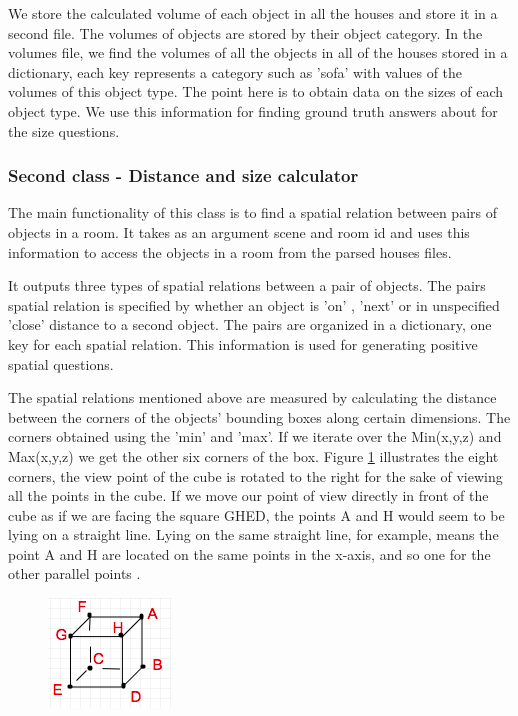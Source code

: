  We store the calculated volume of each object in all the houses and store it in a second file. The volumes of objects are stored by their object category. In the volumes file, we find the volumes of all the objects in all of the houses stored in a dictionary, each key represents a category such as 'sofa' with values of the volumes of this object type. The point here is to obtain data on the sizes of each object type. We use this information for finding ground truth answers about for the size questions.  
 

\subsubsection{Second class - Distance and size calculator}

The main functionality of this class is to find a spatial relation between pairs of objects in a room. It takes as an argument scene and room id and uses this information to access the objects in a room from the parsed houses files. 

It outputs three types of spatial relations between a pair of objects. The pairs spatial relation is specified by whether an object is 'on' , 'next' or in unspecified 'close' distance to a second object. The pairs are organized in a dictionary, one key for each spatial relation. This information is used for generating positive spatial questions. 

The spatial relations mentioned above are measured by calculating the distance between the corners of the objects' bounding boxes along certain dimensions. The corners obtained using the 'min' and 'max'. If we iterate over the Min(x,y,z) and Max(x,y,z) we get the other six corners of the box. Figure \ref{fig:box_points} illustrates the eight corners, the view point of the cube is rotated to the right for the sake of viewing all the points in the cube. If we move our point of view directly in front of the cube as if  we are facing the square GHED,  the points A and H would seem to be lying on a straight line. Lying on the same straight line, for example, means the point A and H are located on the same points in the x-axis, and so one for the other parallel points .\begin{figure}[H]
\includegraphics{images/cornerPoints.png} %
\caption{}
\label{fig:box_points}
\end{figure} 

